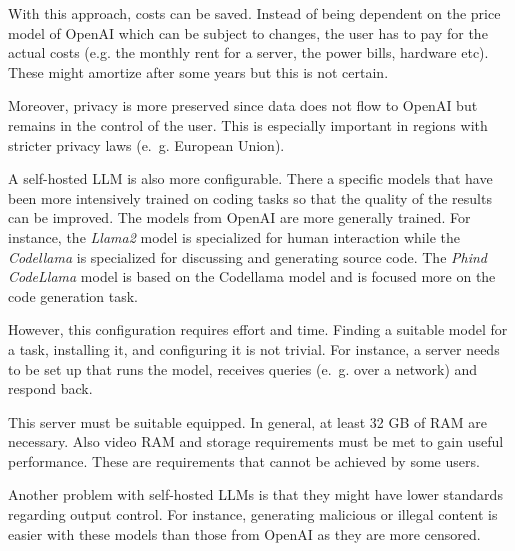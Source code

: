 With this approach, costs can be saved. Instead of being dependent on the price model of OpenAI which can be subject to changes, the user has to pay for the actual costs (e.g. the monthly rent for a server, the power bills, hardware etc). These might amortize after some years but this is not certain.

Moreover, privacy is more preserved since data does not flow to OpenAI but remains in the control of the user. This is especially important in regions with stricter privacy laws (e.~g. European Union).

A self-hosted \ac{LLM} is also more configurable. There a specific models that have been more intensively trained on coding tasks so that the quality of the results can be improved. The models from OpenAI are more generally trained.  For instance, the \textit{Llama2} model is specialized for human interaction while the \textit{Codellama} is specialized for discussing and generating source code. The \textit{Phind CodeLlama} model is based on the Codellama model and is focused more on the code generation task. 

However, this configuration requires effort and time. Finding a suitable model for a task, installing it, and configuring it is not trivial. For instance, a server needs to be set up that  runs the model, receives queries (e.~g. over a network) and respond back. 

This server must be suitable equipped. In general, at least 32 GB of RAM are necessary. Also video RAM and storage requirements must be met to gain useful performance. These are requirements that cannot be achieved by some users. 




Another problem with self-hosted \acfp{LLM} is that they might have lower standards regarding output control. For instance, generating malicious or illegal content is easier with these models than those from OpenAI as they are more censored. 


